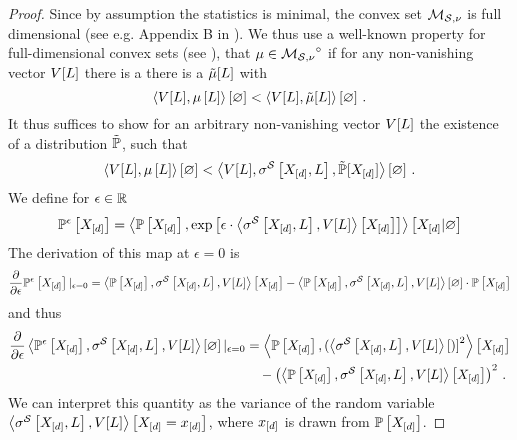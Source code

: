 \begin{proof}
    Since by assumption the statistics is minimal, the convex set $\mathcal{M}_{\mathcal{S},\nu}$ is full dimensional (see e.g. Appendix B in \cite{wainwright_graphical_2008}).
    We thus use a well-known property for full-dimensional convex sets (see \cite{rockafellar_convex_1997,hiriart-urruty_convex_1993}), that $\mu\in{\mathcal{M}_{\mathcal{S},\nu}}^{\circ}$ if for any non-vanishing vector $V[L]$ there is a  %
    there is a $\tilde{\mu}[L]$ with
    \[ \left\langle V[L],\mu\left[L\right]\right\rangle \left[ \varnothing \right] <  \left\langle V[L],\tilde{\mu}[L]\right\rangle \left[ \varnothing \right] \, . \]
    It thus suffices to show for an arbitrary non-vanishing vector $V[L]$ the existence of a distribution $\tilde{\mathbb{P}}$, such that
    \begin{align*}
        \left\langle V[L],\mu\left[L\right]\right\rangle \left[ \varnothing \right] < \left\langle V[L],\sigma^{\mathcal{S}}\left[X_{[d]},L\right],\tilde{\mathbb{P}}[X_{[d]}]\right\rangle \left[ \varnothing \right] \, .
    \end{align*}
    We define for $\epsilon\in\mathbb{R}$
    \begin{align*}
        \mathbb{P}^{\epsilon}\left[X_{[d]}\right]
        = \left\langle \mathbb{P}\left[X_{[d]}\right],\mathrm{exp}\left[\epsilon\cdot\left\langle \sigma^{\mathcal{S}}\left[X_{[d]},L\right],V[L]\right\rangle \left[ X_{[d]} \right]\right]\right\rangle \left[ X_{[d]} | \varnothing \right]
    \end{align*}
    The derivation of this map at $\epsilon=0$ is
    \begin{align*}
        \frac{\partial }{\partial \epsilon}\mathbb{P}^{\epsilon}\left[X_{[d]}\right]|_{\epsilon=0}
        = \left\langle \mathbb{P}\left[X_{[d]}\right],\sigma^{\mathcal{S}}\left[X_{[d]},L\right],V[L]\right\rangle \left[ X_{[d]} \right] - \left\langle \mathbb{P}\left[X_{[d]}\right],\sigma^{\mathcal{S}}\left[X_{[d]},L\right],V[L]\right\rangle \left[ \varnothing \right] \cdot \mathbb{P}\left[X_{[d]}\right]
    \end{align*}
    and thus
    \begin{align*}
        \frac{\partial }{\partial \epsilon} \left\langle \mathbb{P}^{\epsilon}\left[X_{[d]}\right],\sigma^{\mathcal{S}}\left[X_{[d]},L\right],V[L]\right\rangle \left[ \varnothing \right]|_{\epsilon=0}
        &= \left\langle \mathbb{P}\left[X_{[d]}\right],(\left\langle \sigma^{\mathcal{S}}\left[X_{[d]},L\right],V[L]\right\rangle \left[ ) \right]^2\right\rangle \left[ X_{[d]} \right] \\
        & \quad - \left(\left\langle \mathbb{P}\left[X_{[d]}\right],\sigma^{\mathcal{S}}\left[X_{[d]},L\right],V[L]\right\rangle \left[ X_{[d]} \right]\right)^2 \, .
    \end{align*}
    We can interpret this quantity as the variance of the random variable $\left\langle \sigma^{\mathcal{S}}\left[X_{[d]},L\right],V[L]\right\rangle \left[ X_{[d]}=x_{[d]} \right]$, where $x_{[d]}$ is drawn from $\mathbb{P}\left[X_{[d]}\right]$.

\end{proof}
